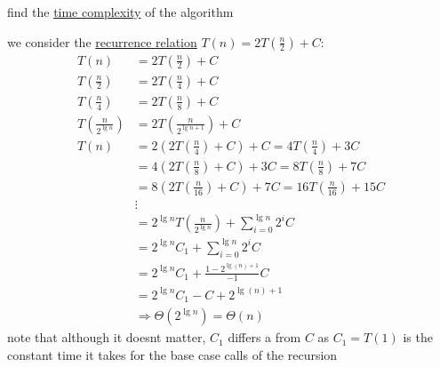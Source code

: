 \documentclass[a4paper,12pt]{article}
\begin{document}
\begin{question}
\begin{subquestion}
find the \href{20221130014441-time_complexity.org}{time complexity} of the algorithm\\
\begin{answer}
we consider the \href{20221105001640-recursive_function.org}{recurrence relation} \(T(n)=2T\left(\frac{n}{2}\right) + C\):\\
\begin{align*}
  T(n) &= 2T\left(\frac{n}{2}\right) + C\\
  T\left(\frac{n}{2}\right) &= 2T\left(\frac{n}{4}\right) + C\\
  T\left(\frac{n}{4}\right) &= 2T\left(\frac{n}{8}\right) + C\\
  T\left(\frac{n}{2^{\lg n}}\right) &= 2T\left(\frac{n}{2^{\lg n+1}}\right) + C\\
  T(n) &= 2\left(2T\left(\frac{n}{4}\right) + C\right) + C = 4T\left(\frac{n}{4}\right) + 3C\\
  &= 4\left(2T\left(\frac{n}{8}\right)+C\right)+3C = 8T\left(\frac{n}{8}\right)+7C\\
  &= 8\left(2T\left(\frac{n}{16}\right)+C\right)+7C = 16T\left(\frac{n}{16}\right)+15C\\
  &\vdots\\
  &= 2^{\lg n}T\left(\frac{n}{2^{\lg n}}\right) + \sum_{i=0}^{\lg n} 2^{i}C\\
  &= 2^{\lg n}C_1 + \sum_{i=0}^{\lg n} 2^{i}C\\
  &= 2^{\lg n}C_1 + \frac{1-2^{\lg(n)+1}}{-1}C\\
  &= 2^{\lg n}C_1-C+2^{\lg(n)+1}\\
  &\Rightarrow \Theta\left(2^{\lg n}\right) = \Theta(n)
\end{align*}
note that although it doesnt matter, \(C_1\) differs a from \(C\) as \(C_1=T(1)\) is the constant time it takes for the base case calls of the recursion\\
\end{answer}
\end{subquestion}
\end{question}
\end{document}
